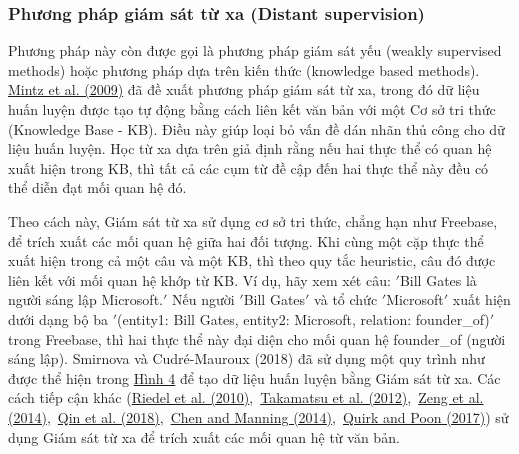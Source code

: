 \newpage
\subsubsection{Phương pháp giám sát từ xa (Distant supervision)}
Phương pháp này còn được gọi là phương pháp giám sát yếu (weakly supervised methods) hoặc phương pháp dựa trên
kiến thức (knowledge based methods).
\href{https://www.sciencedirect.com/science/article/pii/S2667305323000698#br0890}{Mintz et al. (2009)}
đã đề xuất phương pháp giám sát từ xa, trong đó dữ liệu huấn luyện được tạo tự động bằng cách liên kết văn bản với một
Cơ sở tri thức (Knowledge Base - KB). Điều này giúp loại bỏ vấn đề dán nhãn thủ công cho dữ liệu huấn luyện. Học từ xa
dựa trên giả định rằng nếu hai thực thể có quan hệ xuất hiện trong KB, thì tất cả các cụm từ đề cập đến hai thực thể này
đều có thể diễn đạt mối quan hệ đó.

\begin{singlespace}
Theo cách này, Giám sát từ xa sử dụng cơ sở tri thức, chẳng hạn như Freebase, để trích xuất các mối quan hệ giữa hai đối
tượng.
Khi cùng một cặp thực thể xuất hiện trong cả một câu và một KB, thì theo quy tắc heuristic, câu đó được liên kết
với mối quan hệ khớp từ KB. Ví dụ, hãy xem xét câu: \('\)Bill Gates là người sáng lập Microsoft.\('\) Nếu người \('\)Bill Gates\('\) và
tổ chức \('\)Microsoft\('\) xuất hiện dưới dạng bộ ba \('\)(entity1: Bill Gates, entity2: Microsoft, relation: founder_of)\('\) trong Freebase,
thì hai thực thể này đại diện cho mối quan hệ founder\_of (người sáng lập).
Smirnova và Cudré-Mauroux (2018) đã sử dụng một
quy trình như được thể hiện trong \href{https://www.sciencedirect.com/science/article/pii/S2667305323000698#fg0040}{Hình 4}
để tạo dữ liệu huấn luyện bằng Giám sát từ xa.
Các cách tiếp cận khác
(\href{https://www.sciencedirect.com/science/article/pii/S2667305323000698#br1150}{Riedel et al. (2010)}, \href{https://www.sciencedirect.com/science/article/pii/S2667305323000698#br1360}{Takamatsu et al. (2012)}, \href{https://www.sciencedirect.com/science/article/pii/S2667305323000698#br1540}{Zeng et al. (2014)}, \href{https://www.sciencedirect.com/science/article/pii/S2667305323000698#br1080}{Qin et al. (2018)}, \href{https://www.sciencedirect.com/science/article/pii/S2667305323000698#br0220}{Chen and Manning (2014)}, \href{https://www.sciencedirect.com/science/article/pii/S2667305323000698#br1110}{Quirk and Poon (2017)})
sử dụng Giám sát từ xa để trích xuất các mối quan hệ từ văn bản.
\end{singlespace}
